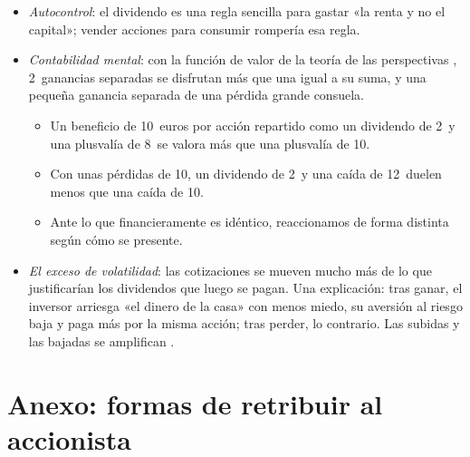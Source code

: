 \documentclass[11pt]{article}
\begin{document}
\begin{itemize}
\item \emph{Autocontrol}: el dividendo es una regla sencilla para gastar «la renta y no el capital»; vender acciones para consumir rompería esa regla\nocite{ShefrinStatman1984}.
\item \emph{Contabilidad mental}: con la función de valor de la teoría de las perspectivas\nocite{KahnemanTversky1979} , 2~ganancias separadas se disfrutan más que una igual a su suma, y una pequeña ganancia separada de una pérdida grande consuela\nocite{Thaler1985Mental}.
  \begin{itemize}
  \item Un beneficio de 10~euros por acción repartido como un dividendo de 2~y una plusvalía de 8~se valora más que una plusvalía de 10.
  \item Con unas pérdidas de 10, un dividendo de 2~y una caída de 12~duelen menos que una caída de 10.
  \item Ante lo que financieramente es idéntico, reaccionamos de forma distinta según cómo se presente.
  \end{itemize}
\item \emph{El exceso de volatilidad}: las cotizaciones se mueven mucho más de lo que justificarían los dividendos que luego se pagan\nocite{Shiller1981Move}. Una explicación: tras ganar, el inversor arriesga «el dinero de la casa» con menos miedo\nocite{ThalerJohnson1990}, su aversión al riesgo baja y paga más por la misma acción; tras perder, lo contrario. Las subidas y las bajadas se amplifican\nocite{BarberisHuangSantos2001Prospect} .
\end{itemize}

\section{Anexo: formas de retribuir al accionista}\label{anexo:retribucion}
\end{document}
